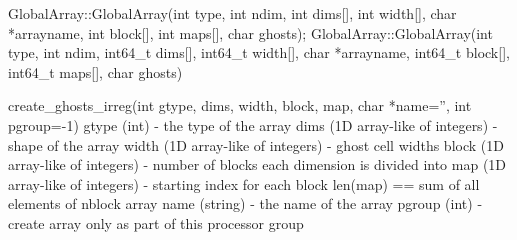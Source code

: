 \documentclass[12pt]{article}
\begin{document}
\begin{cxxapi}
\begin{cxxcode}
GlobalArray::GlobalArray(int type, int ndim, int dims[], int width[], 
                         char *arrayname,
                         int block[], int maps[], char ghosts);
GlobalArray::GlobalArray(int type, int ndim, int64_t dims[], 
                         int64_t width[], char *arrayname,
                         int64_t block[], int64_t maps[], char ghosts)
\end{cxxcode}
\begin{funcargs}
\end{funcargs}
\end{cxxapi}

\begin{pyapi}
\begin{pycode}
create_ghosts_irreg(int gtype, dims, width, block, map, char *name='', 
int pgroup=-1)
   gtype (int)                       - the type of the array
   dims (1D array-like of integers)  - shape of the array
   width (1D array-like of integers) - ghost cell widths
   block (1D array-like of integers) - number of blocks each dimension is 
                                       divided into
   map (1D array-like of integers)   - starting index for each block 
                                       len(map) == sum of all elements of 
                                       nblock array
   name (string)                     - the name of the array
   pgroup (int)                      - create array only as part of this 
                                       processor group
\end{pycode}
\end{pyapi}
\end{document}
